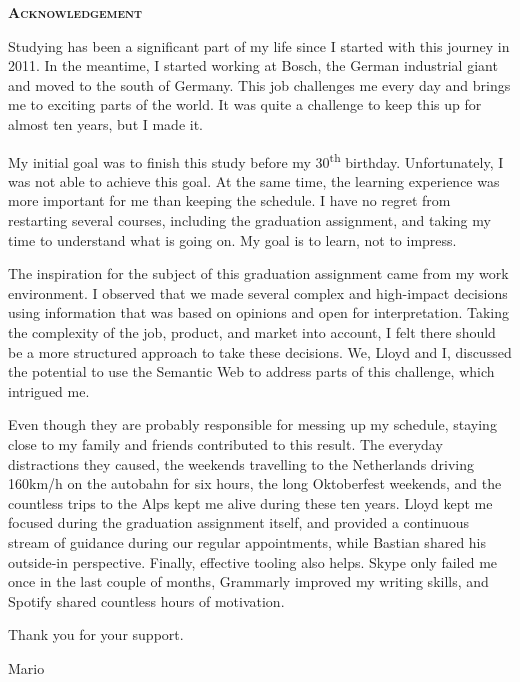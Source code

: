 \thispagestyle{empty}
\begin{center}
\textsc{\normalfont\Huge\bfseries\color{document}Acknowledgement} 
\end{center}
Studying has been a significant part of my life since I started with this journey in 2011. In the meantime, I started working at Bosch, the German industrial giant and moved to the south of Germany. This job challenges me every day and brings me to exciting parts of the world. It was quite a challenge to keep this up for almost ten years, but I made it. 

My initial goal was to finish this study before my 30\textsuperscript{th} birthday. Unfortunately, I was not able to achieve this goal. At the same time, the learning experience was more important for me than keeping the schedule. I have no regret from restarting several courses, including the graduation assignment, and taking my time to understand what is going on. My goal is to learn, not to impress.

The inspiration for the subject of this graduation assignment came from my work environment. I observed that we made several complex and high-impact decisions using information that was based on opinions and open for interpretation. Taking the complexity of the job, product, and market into account, I felt there should be a more structured approach to take these decisions. We, Lloyd and I, discussed the potential to use the Semantic Web to address parts of this challenge, which intrigued me.

Even though they are probably responsible for messing up my schedule, staying close to my family and friends contributed to this result. The everyday distractions they caused, the weekends travelling to the Netherlands driving 160km/h on the autobahn for six hours, the long Oktoberfest weekends, and the countless trips to the Alps kept me alive during these ten years. Lloyd kept me focused during the graduation assignment itself, and provided a continuous stream of guidance during our regular appointments, while Bastian shared his outside-in perspective. Finally, effective tooling also helps. Skype only failed me once in the last couple of months, Grammarly improved my writing skills, and Spotify shared countless hours of motivation. 

Thank you for your support.

Mario

\vspace*{\fill} 